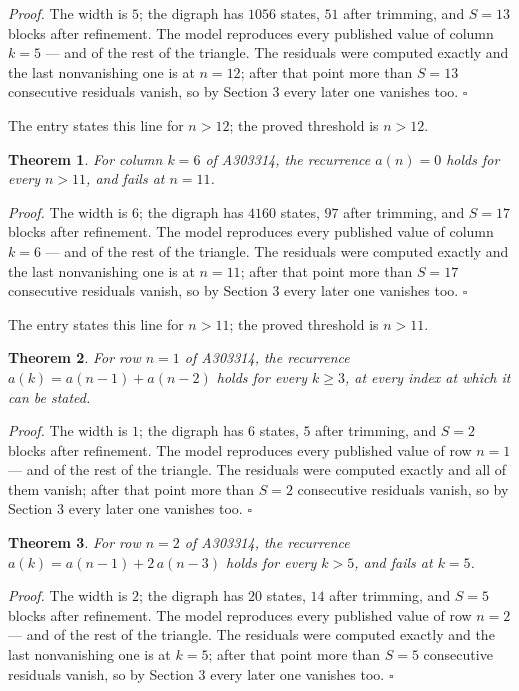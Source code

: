 \documentclass[11pt]{article}
\newtheorem{theorem}{Theorem}
\theoremstyle{definition}
\begin{document}
{\itshape Proof.} The width is $5$; the digraph has $1056$ states, $51$ after trimming, and $S = 13$ blocks after refinement. The model reproduces every published value of column $k = 5$ --- and of the rest of the triangle. The residuals were computed exactly and the last nonvanishing one is at $n = 12$; after that point more than $S = 13$ consecutive residuals vanish, so by Section 3 every later one vanishes too. $\square$

The entry states this line for $n > 12$; the proved threshold is $n > 12$.

\begin{theorem} For column $k = 6$ of A303314, the recurrence $a(n) = 0$ holds for every $n > 11$, and fails at $n = 11$.\end{theorem}

{\itshape Proof.} The width is $6$; the digraph has $4160$ states, $97$ after trimming, and $S = 17$ blocks after refinement. The model reproduces every published value of column $k = 6$ --- and of the rest of the triangle. The residuals were computed exactly and the last nonvanishing one is at $n = 11$; after that point more than $S = 17$ consecutive residuals vanish, so by Section 3 every later one vanishes too. $\square$

The entry states this line for $n > 11$; the proved threshold is $n > 11$.

\begin{theorem} For row $n = 1$ of A303314, the recurrence $a(k) = a(n-1) + a(n-2)$ holds for every $k \ge 3$, at every index at which it can be stated.\end{theorem}

{\itshape Proof.} The width is $1$; the digraph has $6$ states, $5$ after trimming, and $S = 2$ blocks after refinement. The model reproduces every published value of row $n = 1$ --- and of the rest of the triangle. The residuals were computed exactly and all of them vanish; after that point more than $S = 2$ consecutive residuals vanish, so by Section 3 every later one vanishes too. $\square$

\begin{theorem} For row $n = 2$ of A303314, the recurrence $a(k) = a(n-1) + 2\,a(n-3)$ holds for every $k > 5$, and fails at $k = 5$.\end{theorem}

{\itshape Proof.} The width is $2$; the digraph has $20$ states, $14$ after trimming, and $S = 5$ blocks after refinement. The model reproduces every published value of row $n = 2$ --- and of the rest of the triangle. The residuals were computed exactly and the last nonvanishing one is at $k = 5$; after that point more than $S = 5$ consecutive residuals vanish, so by Section 3 every later one vanishes too. $\square$
\end{document}
